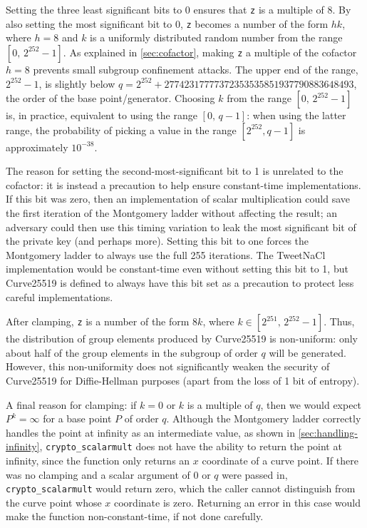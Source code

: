 \documentclass{article}
\begin{document}
Setting the three least significant bits to 0 ensures that \verb|z| is a multiple of 8.
By also setting the most significant bit to 0, \verb|z| becomes a number of the form $hk$, where $h=8$ and $k$ is a uniformly distributed random number from the range $[0,\, 2^{252}-1]$.
As explained in \autoref{sec:cofactor}, making \verb|z| a multiple of the cofactor $h=8$ prevents small subgroup confinement attacks.
The upper end of the range, $2^{252}-1$, is slightly below $q = 2^{252} + 27742317777372353535851937790883648493$, the order of the base point/generator.
Choosing $k$ from the range $[0,\, 2^{252}-1]$ is, in practice, equivalent to using the range $[0,\, q-1]$: when using the latter range, the probability of picking a value in the range $[2^{252}, q-1]$ is approximately $10^{-38}$.

The reason for setting the second-most-significant bit to 1 is unrelated to the cofactor: it is instead a precaution to help ensure constant-time implementations.
If this bit was zero, then an implementation of scalar multiplication could save the first iteration of the Montgomery ladder without affecting the result; an adversary could then use this timing variation to leak the most significant bit of the private key (and perhaps more).
Setting this bit to one forces the Montgomery ladder to always use the full 255 iterations.
The TweetNaCl implementation would be constant-time even without setting this bit to 1, but Curve25519 is defined to always have this bit set as a precaution to protect less careful implementations.

After clamping, \verb|z| is a number of the form $8k$, where $k \in [2^{251},\, 2^{252}-1]$.
Thus, the distribution of group elements produced by Curve25519 is non-uniform: only about half of the group elements in the subgroup of order $q$ will be generated.
However, this non-uniformity does not significantly weaken the security of Curve25519 for Diffie-Hellman purposes (apart from the loss of 1 bit of entropy).

A final reason for clamping: if $k=0$ or $k$ is a multiple of $q$, then we would expect $P^k = \infty$ for a base point $P$ of order $q$.
Although the Montgomery ladder correctly handles the point at infinity as an intermediate value, as shown in \autoref{sec:handling-infinity}, \verb|crypto_scalarmult| does not have the ability to return the point at infinity, since the function only returns an $x$ coordinate of a curve point.
If there was no clamping and a scalar argument of $0$ or $q$ were passed in, \verb|crypto_scalarmult| would return zero, which the caller cannot distinguish from the curve point whose $x$ coordinate is zero.
Returning an error in this case would make the function non-constant-time, if not done carefully.
\end{document}
